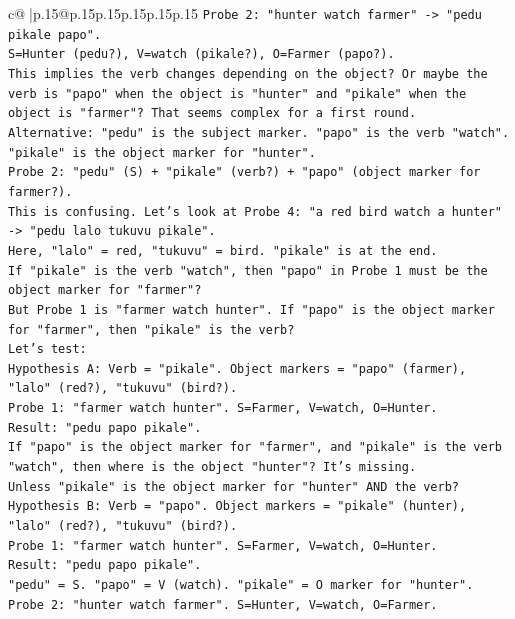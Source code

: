 \documentclass{article}
\begin{document}
{\begin{supertabular}{c@{$\;$}|p{.15\linewidth}@{}p{.15\linewidth}p{.15\linewidth}p{.15\linewidth}p{.15\linewidth}p{.15\linewidth}}
{{{\texttt{Probe 2: "hunter watch farmer" {-}> "pedu pikale papo".} \\
\texttt{S=Hunter (pedu?), V=watch (pikale?), O=Farmer (papo?).} \\
\texttt{This implies the verb changes depending on the object? Or maybe the verb is "papo" when the object is "hunter" and "pikale" when the object is "farmer"? That seems complex for a first round.} \\
\texttt{Alternative: "pedu" is the subject marker. "papo" is the verb "watch". "pikale" is the object marker for "hunter".} \\
\texttt{Probe 2: "pedu" (S) + "pikale" (verb?) + "papo" (object marker for farmer?).} \\
\texttt{This is confusing. Let's look at Probe 4: "a red bird watch a hunter" {-}> "pedu lalo tukuvu pikale".} \\
\texttt{Here, "lalo" = red, "tukuvu" = bird. "pikale" is at the end.} \\
\texttt{If "pikale" is the verb "watch", then "papo" in Probe 1 must be the object marker for "farmer"?} \\
\texttt{But Probe 1 is "farmer watch hunter". If "papo" is the object marker for "farmer", then "pikale" is the verb?} \\
\texttt{Let's test:} \\
\texttt{Hypothesis A: Verb = "pikale". Object markers = "papo" (farmer), "lalo" (red?), "tukuvu" (bird?).} \\
\texttt{Probe 1: "farmer watch hunter". S=Farmer, V=watch, O=Hunter.} \\
\texttt{Result: "pedu papo pikale".} \\
\texttt{If "papo" is the object marker for "farmer", and "pikale" is the verb "watch", then where is the object "hunter"? It's missing.} \\
\texttt{Unless "pikale" is the object marker for "hunter" AND the verb?} \\
\texttt{Hypothesis B: Verb = "papo". Object markers = "pikale" (hunter), "lalo" (red?), "tukuvu" (bird?).} \\
\texttt{Probe 1: "farmer watch hunter". S=Farmer, V=watch, O=Hunter.} \\
\texttt{Result: "pedu papo pikale".} \\
\texttt{"pedu" = S. "papo" = V (watch). "pikale" = O marker for "hunter".} \\
\texttt{Probe 2: "hunter watch farmer". S=Hunter, V=watch, O=Farmer.} \\
}}}
\end{supertabular}}
\end{document}
